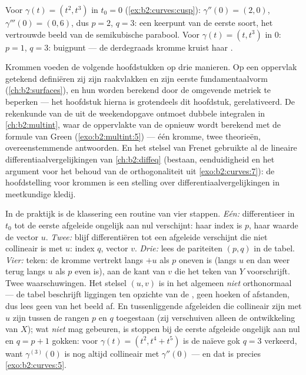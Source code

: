 \begin{example}
Voor $\gamma(t) = (t^2, t^3)$ in $t_0 = 0$
(\cref{ex:b2:curves:cusp}): $\gamma'' (0)= (2, 0)$, $\gamma'''(0) =
(0, 6)$, dus $p = 2$, $q = 3$: een keerpunt van de eerste soort,
het vertrouwde beeld van de semikubische parabool. Voor $\gamma(t)
= (t, t^3)$ in $0$: $p = 1$, $q = 3$: buigpunt --- de derdegraads
kromme kruist haar .
\end{example}

\begin{remark}
Krommen voeden de volgende hoofdstukken op drie manieren. Op een
oppervlak getekend definiëren zij zijn raakvlakken en zijn eerste
fundamentaalvorm (\cref{ch:b2:surfaces}), en hun  worden
berekend door de omgevende metriek te beperken --- het hoofdstuk
hierna is grotendeels dit hoofdstuk, gerelativeerd. De rekenkunde
van de  uit de weekendopgave ontmoet dubbele integralen
in \cref{ch:b2:multint}, waar de oppervlakte van de 
opnieuw wordt berekend met de formule van Green
(\cref{exo:b2:multint:5}) --- één kromme, twee theorieën,
overeenstemmende antwoorden. En het stelsel van Frenet gebruikte al
de lineaire differentiaalvergelijkingen van \cref{ch:b2:diffeq}
(bestaan, eenduidigheid en het argument voor het behoud van de
orthogonaliteit uit \cref{exo:b2:curves:7}): de hoofdstelling voor
krommen is een stelling over differentiaalvergelijkingen in
meetkundige kledij.
\end{remark}

\begin{remark}
In de praktijk is de klassering een routine van vier stappen.
\emph{Eén:} differentieer in $t_0$ tot de eerste afgeleide
ongelijk aan nul verschijnt: haar index is $p$, haar waarde de
vector $u$. \emph{Twee:} blijf differentiëren tot een afgeleide
verschijnt die niet collineair is met $u$: index $q$, vector $v$.
\emph{Drie:} lees de pariteiten $(p, q)$ in de tabel. \emph{Vier:}
teken: de kromme vertrekt langs $+u$ als $p$ oneven is (langs $u$
en dan weer terug langs $u$ als $p$ even is), aan de kant van $v$
die het teken van $Y$ voorschrijft. Twee waarschuwingen. Het
stelsel $(u, v)$ is in het algemeen \emph{niet} orthonormaal --- de
tabel beschrijft liggingen ten opzichte van de , geen
hoeken of afstanden, dus lees geen  van het beeld af. En
tussenliggende afgeleiden die collineair zijn met $u$ zijn tussen
de rangen $p$ en $q$ toegestaan (zij verschuiven alleen de
ontwikkeling van $X$); wat \emph{niet} mag gebeuren, is stoppen bij
de eerste afgeleide ongelijk aan nul en $q = p + 1$ gokken: voor
$\gamma(t) = (t^2, t^4 + t^5)$ is de naïeve gok $q = 3$ verkeerd,
want $\gamma^{(3)}(0)$ is nog altijd collineair met $\gamma''(0)$
--- en dat is precies \cref{exo:b2:curves:5}.
\end{remark}


